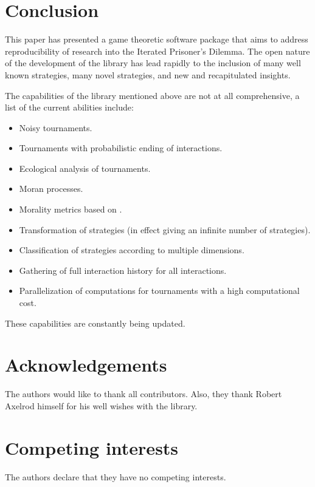 \documentclass{jors}
\begin{document}
\section*{Conclusion}

This paper has presented a game theoretic software package that aims to address
reproducibility of research into the Iterated Prisoner's Dilemma. The open
nature of the development of the library has lead rapidly to the inclusion of
many well known strategies, many novel strategies, and new and recapitulated
insights.

The capabilities of the library mentioned above are not at all comprehensive, a
list of the current abilities include:

\begin{itemize}[noitemsep,topsep=0pt]
    \item Noisy tournaments.
    \item Tournaments with probabilistic ending of interactions.
    \item Ecological analysis of tournaments.
    \item Moran processes.
    \item Morality metrics based on \cite{Singer-Clark2014}.
    \item Transformation of strategies (in effect giving an infinite number of
        strategies).
    \item Classification of strategies according to multiple dimensions.
    \item Gathering of full interaction history for all interactions.
    \item Parallelization of computations for tournaments with a high
        computational cost.
\end{itemize}

These capabilities are constantly being updated.

\section*{Acknowledgements}

The authors would like to thank all contributors. Also, they thank
Robert Axelrod himself for his well wishes with the library.

\section*{Competing interests}

The authors declare that they have no competing interests.

\printbibliography
%
%
\end{document}
